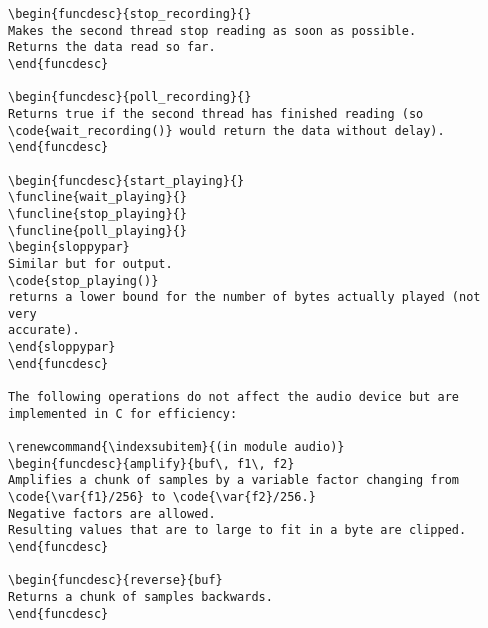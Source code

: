 \begin{verbatim}
\begin{funcdesc}{stop_recording}{}
Makes the second thread stop reading as soon as possible.
Returns the data read so far.
\end{funcdesc}

\begin{funcdesc}{poll_recording}{}
Returns true if the second thread has finished reading (so
\code{wait_recording()} would return the data without delay).
\end{funcdesc}

\begin{funcdesc}{start_playing}{}
\funcline{wait_playing}{}
\funcline{stop_playing}{}
\funcline{poll_playing}{}
\begin{sloppypar}
Similar but for output.
\code{stop_playing()}
returns a lower bound for the number of bytes actually played (not very
accurate).
\end{sloppypar}
\end{funcdesc}

The following operations do not affect the audio device but are
implemented in C for efficiency:

\renewcommand{\indexsubitem}{(in module audio)}
\begin{funcdesc}{amplify}{buf\, f1\, f2}
Amplifies a chunk of samples by a variable factor changing from
\code{\var{f1}/256} to \code{\var{f2}/256.}
Negative factors are allowed.
Resulting values that are to large to fit in a byte are clipped.         
\end{funcdesc}

\begin{funcdesc}{reverse}{buf}
Returns a chunk of samples backwards.
\end{funcdesc}


\end{verbatim}

